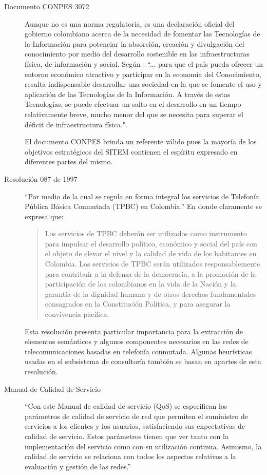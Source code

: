 \begin{description}
\item[Documento CONPES 3072] Aunque no es una norma regulatoria, es una declaración oficial del gobierno colombiano acerca de la necesidad de fomentar las Tecnologías de la Información para potenciar la absorción, creación y divulgación del conocimiento por medio del desarrollo sostenible en las infraestructuras física, de información y social. Según \cite{mincomunicaciones3072}:  “... para que el país pueda ofrecer un entorno económico atractivo y participar en la economía del Conocimiento, resulta indispensable desarrollar una sociedad en la que se fomente el uso y aplicación de las Tecnologías de la Información. A través de estas Tecnologías, se puede efectuar un salto en el desarrollo en un tiempo relativamente breve, mucho menor del que se necesita para superar el déficit de infraestructura física.".

El documento CONPES brinda un referente válido pues la mayoría de los objetivos estratégicos del SITEM contienen el espíritu expresado en diferentes partes del mismo.

\item[Resolución 087 de 1997] “Por medio de la cual se regula en forma integral los servicios de Telefonía Pública Básica Conmutada (TPBC) en Colombia.” En donde claramente se expresa que: \begin{quote}
Los servicios de TPBC deberán ser utilizados como instrumento para impulsar el desarrollo político, económico y social del país con el objeto de elevar el nivel y la calidad de vida de los habitantes en Colombia. Los servicios de TPBC serán utilizados responsablemente para contribuir a la defensa de la democracia, a la promoción de la participación de los colombianos en la vida de la Nación y la garantía de la dignidad humana y de otros derechos fundamentales consagrados en la Constitución Política, y para asegurar la convivencia pacífica.\end{quote} 

Esta resolución presenta particular importancia para la extracción de elementos semánticos y algunos componentes necesarios en las redes de telecomunicaciones basadas en telefonía conmutada. Algunas heurísticas usadas en el subsistema de consultoría también se basan en apartes de esta resolución.

\item [Manual de Calidad de Servicio] “Con este Manual de calidad de servicio (QoS) se especifican los parámetros de calidad de servicio de red que permiten el suministro de servicios a los clientes y los usuarios, satisfaciendo sus expectativas de calidad de servicio. Estos parámetros tienen que ver tanto con la implementación del servicio como con su utilización continua. Asimismo, la calidad de servicio se relaciona con todos los aspectos relativos a la evaluación y gestión de las redes.”\cite{ITU2004}


\end{description}
